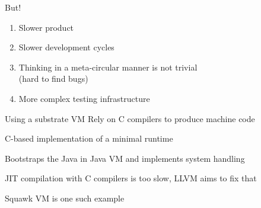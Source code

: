 \documentclass[
14pt,
aspectratio=169,
usenames,
dvipsnames,
x11names]{beamer}
\begin{document}
\begin{frame}{But!}
  \begin{enumerate}
  \item Slower product
  \item Slower development cycles
  \item Thinking in a meta-circular manner is not trivial\\
    (hard to find bugs)
  \item More complex testing infrastructure
  \end{enumerate}
\end{frame}

\begin{frame}{Using a substrate VM}
  Rely on \alert{C compilers} to produce machine code

  \vfill

  C-based implementation of a \alert{minimal runtime}

  \vfill

  \alert{Bootstraps} the Java in Java VM and implements \alert{system handling}

  \vfill

  JIT compilation with C compilers is \alert{too slow}, LLVM aims to fix that

  \vfill

  \alert{Squawk VM} is one such example
\end{frame}
\end{document}

